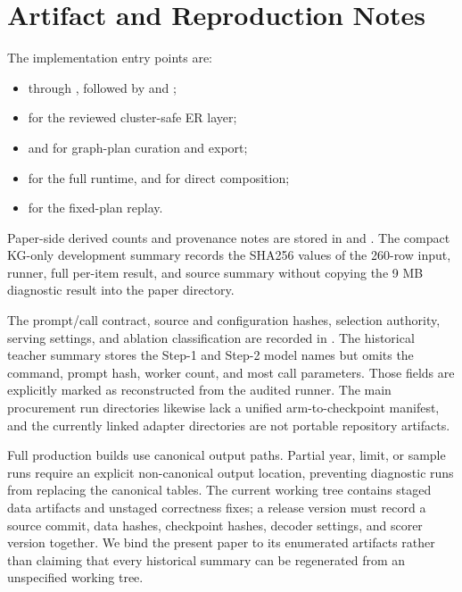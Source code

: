 \section{Artifact and Reproduction Notes}
\label{app:artifacts}

The implementation entry points are:
\begin{itemize}
  \item {} through , followed by
   and ;
  \item {} for the reviewed cluster-safe ER layer;
  \item {} and  for graph-plan
  curation and export;
  \item {} for the full runtime, and
   for direct composition;
  \item {} for the fixed-plan replay.
\end{itemize}

Paper-side derived counts and provenance notes are stored in
 and
.  The compact KG-only development summary records
the SHA256 values of the 260-row input, runner, full per-item result, and source summary without
copying the 9 MB diagnostic result into the paper directory.

The prompt/call contract, source and configuration hashes, selection authority, serving settings,
and ablation classification are recorded in
.  The historical teacher summary stores
the Step-1 and Step-2 model names but omits the command, prompt hash, worker count, and most call
parameters.  Those fields are explicitly marked as reconstructed from the audited runner.  The
main procurement run directories likewise lack a unified arm-to-checkpoint manifest, and the
currently linked adapter directories are not portable repository artifacts.

Full production builds use canonical output paths.  Partial year, limit, or sample runs require an
explicit non-canonical output location, preventing diagnostic runs from replacing the canonical
tables.  The current working tree contains staged data artifacts and unstaged correctness fixes;
a release version must record a source commit, data hashes, checkpoint hashes, decoder settings,
and scorer version together.  We bind the present paper to its enumerated artifacts rather than
claiming that every historical summary can be regenerated from an unspecified working tree.

